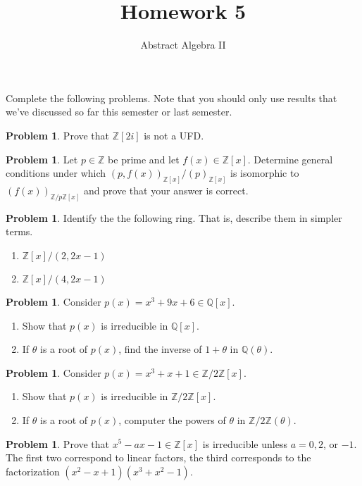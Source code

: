 \documentclass[11pt]{scrartcl}
\theoremstyle{definition}
\newtheorem{problem}[theorem]{Problem}
\newcommand{\blankline}{\pagebreak[2]\vspace{.5\baselineskip}}
\begin{document}
\title{Homework 5}
\subtitle{Abstract Algebra II}
\date{}

\maketitle
\thispagestyle{fancy}

Complete the following problems. Note that you should only use results that we've discussed so far this semester or last semester.

%

\begin{problem}
Prove that $\mathbb{Z}[2i]$ is not a UFD.
\end{problem}

\begin{problem}
Let $p\in \mathbb{Z}$ be prime and let $f(x)\in \mathbb{Z}[x]$.  Determine general conditions under which $(p,f(x))_{\mathbb{Z}[x]}/(p)_{\mathbb{Z}[x]}$ is isomorphic to $(f(x))_{\mathbb{Z}/p\mathbb{Z}[x]}$ and prove that your answer is correct.
\end{problem}

\begin{problem}
Identify the the following ring. That is, describe them in simpler terms.
\begin{enumerate}[label=\rm{(\alph*)}]
\item $\mathbb{Z}[x]/(2,2x-1)$
\item $\mathbb{Z}[x]/(4,2x-1)$
\end{enumerate}
\end{problem}

\begin{problem}
Consider $p(x)=x^3+9x+6\in\mathbb{Q}[x]$.
\begin{enumerate}[label=\rm{(\alph*)}]
\item Show that $p(x)$ is irreducible in $\mathbb{Q}[x]$.
\item If $\theta$ is a root of $p(x)$, find the inverse of $1+\theta$ in $\mathbb{Q}(\theta)$.
\end{enumerate}
\end{problem}

\begin{problem}
Consider $p(x)=x^3+x+1\in\mathbb{Z}/2\mathbb{Z}[x]$.
\begin{enumerate}[label=\rm{(\alph*)}]
\item Show that $p(x)$ is irreducible in $\mathbb{Z}/2\mathbb{Z}[x]$.
\item If $\theta$ is a root of $p(x)$, computer the powers of $\theta$ in $\mathbb{Z}/2\mathbb{Z}(\theta)$.
\end{enumerate}
\end{problem}

\begin{problem}
Prove that $x^5-ax-1\in\mathbb{Z}[x]$ is irreducible unless $a=0,2$, or $-1$.  The first two correspond to linear factors, the third corresponds to the factorization $(x^2-x+1)(x^3+x^2-1)$.
\end{problem}
\end{document}
